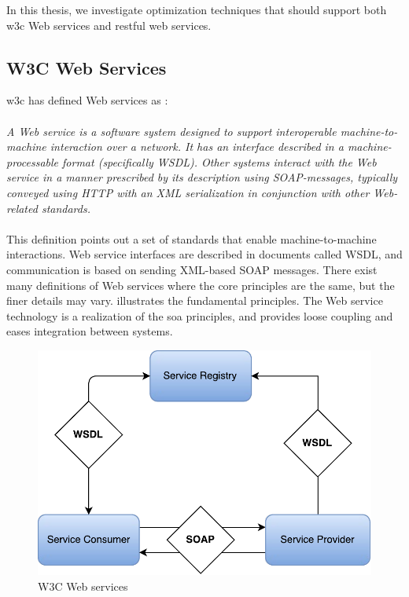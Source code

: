 In this thesis, we investigate optimization techniques that should support both
\gls{w3c} Web services and \gls{rest}ful web services.

\subsection{W3C Web Services}
\label{w3c-web-services}

\gls{w3c} has defined Web services as \cite{wrc-web-service}:

\paragraph{}
\textit{
    A Web service is a software system designed to support interoperable
    machine-to-machine interaction over a network. It has an interface described in
    a machine-processable format (specifically WSDL). Other systems interact with
    the Web service in a manner prescribed by its description using SOAP-messages,
    typically conveyed using HTTP with an XML serialization in conjunction with
    other Web-related standards.
}

\paragraph{}

This definition points out a set of standards that enable machine-to-machine
interactions. Web service interfaces are described in documents called WSDL, and
communication is based on sending XML-based SOAP messages. There exist many
definitions of Web services where the core principles are the same, but the
finer details may vary.  illustrates the
fundamental principles. The Web service technology is a realization of the
\gls{soa} principles, and provides loose coupling and eases integration between
systems.

\begin{figure}[h]
\centering
\includegraphics[scale=0.6]{images/web_services.pdf}
\caption{W3C Web services}
\label{figure-w3c-web-services}
\end{figure}

